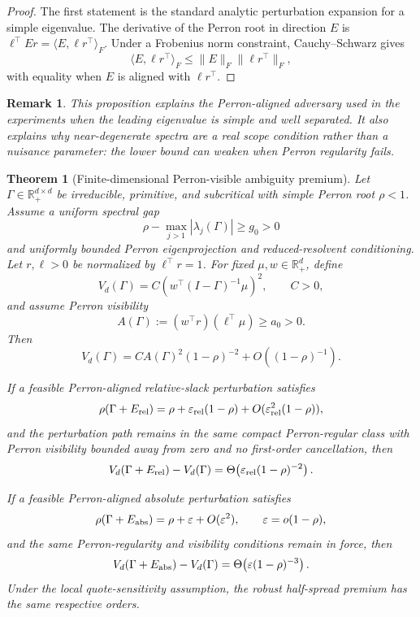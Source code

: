 \documentclass[11pt]{article}
\newtheorem{theorem}[assumption]{Theorem}
\newtheorem{remark}[assumption]{Remark}
\newcommand{\R}{\mathbb{R}}
\newcommand{\eps}{\varepsilon}
\begin{document}
\begin{proof}
The first statement is the standard analytic perturbation expansion for a
simple eigenvalue. The derivative of the Perron root in direction $E$ is
$\ell^\top E r=\langle E,\ell r^\top\rangle_F$. Under a Frobenius norm
constraint, Cauchy--Schwarz gives
\[
\langle E,\ell r^\top\rangle_F
\le \|E\|_F\|\ell r^\top\|_F,
\]
with equality when $E$ is aligned with $\ell r^\top$.
\end{proof}

\begin{remark}
This proposition explains the Perron-aligned adversary used in the experiments
when the leading eigenvalue is simple and well separated. It also explains why
near-degenerate spectra are a real scope condition rather than a nuisance
parameter: the lower bound can weaken when Perron regularity fails.
\end{remark}

\begin{theorem}[Finite-dimensional Perron-visible ambiguity premium]
Let $\Gamma\in\R_+^{d\times d}$ be irreducible, primitive, and subcritical
with simple Perron root $\rho<1$. Assume a uniform spectral gap
\[
\rho-\max_{j>1}|\lambda_j(\Gamma)|\ge g_0>0
\]
and uniformly bounded Perron eigenprojection and reduced-resolvent
conditioning. Let $r,\ell>0$ be normalized by $\ell^\top r=1$. For fixed
$\mu,w\in\R_+^d$, define
\[
V_d(\Gamma)=C\left(w^\top(I-\Gamma)^{-1}\mu\right)^2,
\qquad C>0,
\]
and assume Perron visibility
\[
A(\Gamma):=(w^\top r)(\ell^\top\mu)\ge a_0>0.
\]
Then
\[
V_d(\Gamma)=C A(\Gamma)^2(1-\rho)^{-2}+O((1-\rho)^{-1}).
\]

If a feasible Perron-aligned relative-slack perturbation satisfies
\[
\rho(\Gamma+E_{\rm rel})
=\rho+\eps_{\rm rel}(1-\rho)+O(\eps_{\rm rel}^2(1-\rho)),
\]
and the perturbation path remains in the same compact Perron-regular class with
Perron visibility bounded away from zero and no first-order cancellation,
then
\[
V_d(\Gamma+E_{\rm rel})-V_d(\Gamma)
=\Theta\!\left(\eps_{\rm rel}(1-\rho)^{-2}\right).
\]

If a feasible Perron-aligned absolute perturbation satisfies
\[
\rho(\Gamma+E_{\rm abs})=\rho+\eps+O(\eps^2),
\qquad \eps=o(1-\rho),
\]
and the same Perron-regularity and visibility conditions remain in force,
then
\[
V_d(\Gamma+E_{\rm abs})-V_d(\Gamma)
=\Theta\!\left(\eps(1-\rho)^{-3}\right).
\]
Under the local quote-sensitivity assumption, the robust half-spread premium
has the same respective orders.
\end{theorem}
\end{document}
